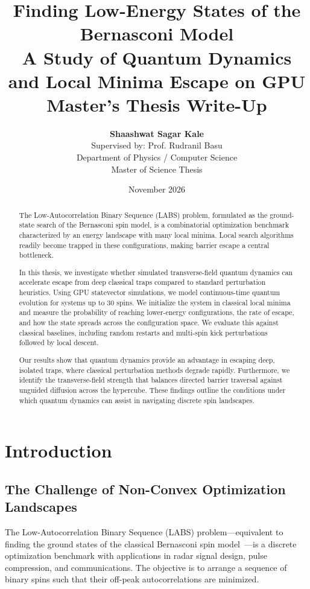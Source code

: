 \documentclass[12pt,a4paper]{report}
\title{
    \vspace{-1.5in}
    \LARGE \textbf{Finding Low-Energy States of the Bernasconi Model}\\[0.5em]
    \large A Study of Quantum Dynamics and Local Minima Escape on GPU\\[0.5em]
    \large Master's Thesis Write-Up
}
\author{
    \textbf{Shaashwat Sagar Kale}\\[0.25em]
    \small Supervised by: Prof. Rudranil Basu\\[0.25em]
    \small Department of Physics / Computer Science\\
    \small Master of Science Thesis
}
\date{November 2026}
\begin{document}
\maketitle

\begin{abstract}
The Low-Autocorrelation Binary Sequence (LABS) problem, formulated as the ground-state search of the Bernasconi spin model, is a combinatorial optimization benchmark characterized by an energy landscape with many local minima. Local search algorithms readily become trapped in these configurations, making barrier escape a central bottleneck.

In this thesis, we investigate whether simulated transverse-field quantum dynamics can accelerate escape from deep classical traps compared to standard perturbation heuristics. Using GPU statevector simulations, we model continuous-time quantum evolution for systems up to 30 spins. We initialize the system in classical local minima and measure the probability of reaching lower-energy configurations, the rate of escape, and how the state spreads across the configuration space. We evaluate this against classical baselines, including random restarts and multi-spin kick perturbations followed by local descent.

Our results show that quantum dynamics provide an advantage in escaping deep, isolated traps, where classical perturbation methods degrade rapidly. Furthermore, we identify the transverse-field strength that balances directed barrier traversal against unguided diffusion across the hypercube. These findings outline the conditions under which quantum dynamics can assist in navigating discrete spin landscapes.
\end{abstract}

\tableofcontents
\newpage

\chapter{Introduction}
\label{ch:intro}

\section{The Challenge of Non-Convex Optimization Landscapes}
\label{sec:context}
The Low-Autocorrelation Binary Sequence (LABS) problem---equivalent to finding the ground states of the classical Bernasconi spin model~\cite{bernasconi1987, packebusch2016}---is a discrete optimization benchmark with applications in radar signal design, pulse compression, and communications. The objective is to arrange a sequence of binary spins such that their off-peak autocorrelations are minimized.
\end{document}
